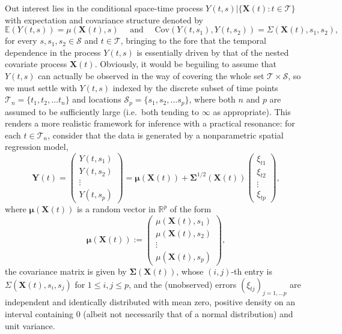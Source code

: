 \documentclass[aos]{imsart}
\theoremstyle{plain}
\theoremstyle{remark}
\def\E{\mathbb{E}}
\newcommand{\Scal}{\mathcal{S}}
\newcommand{\Tcal}{\mathcal{T}}
\newcommand{\bb}[1]{\boldsymbol{#1}}
\newcommand{\cov}{\mathrm{Cov}}
\begin{document}
Out interest lies in the conditional space-time process  $Y(t, s) | \{ \bb{X}(t) : t \in \Tcal\}$ with expectation and covariance structure denoted by
\begin{equation}
      \E(Y(t, s)) = \mu(\bb{X}(t), s) \quad  \mbox{ and }  \quad
      \cov(Y(t, s_1), Y(t, s_2)) = \Sigma(\bb{X}(t), s_1, s_2),
    \label{eqn:general-setup}
\end{equation}
for every $s, s_1, s_2 \in \Scal$ and $t \in \Tcal$, bringing to the fore that the temporal dependence in the process $Y(t, s)$ is essentially driven by that of the nested covariate process $\bb{X}(t)$. Obviously, it would be beguiling to assume that $Y(t, s)$ can actually be observed in the way of covering the whole set $\Tcal \times \Scal$, so we must settle with $Y(t, s)$ indexed by the discrete subset of time points $\Tcal_n = \{t_1, t_2, \dots t_n \}$ and locations $\Scal_p = \{ s_1, s_2, \dots s_p \}$, where both $n$ and $p$ are assumed to be sufficiently large (i.e.\ both tending to $\infty$ as appropriate). This renders a more realistic framework for inference with a practical resonance: for each $t \in \Tcal_n$, consider that the data is generated by a nonparametric spatial regression model,
\begin{equation}\label{eqn:setup}
    \bb{Y}(t) = 
    \begin{pmatrix}
    Y(t,s_1)\\ Y(t, s_2) \\ \vdots \\ Y(t, s_p)
    \end{pmatrix} 
    = \bb{\mu}(\bb{X}(t)) 
    + \bb{\Sigma}^{1/2}(\bb{X}(t)) \begin{pmatrix}
   \xi_{t1}\\ \xi_{t2} \\ \vdots \\ \xi_{tp}
    \end{pmatrix},
\end{equation}
where $\bb{\mu}(\bb{X}(t))$ is a random vector in $\mathbb{R}^p$ of the form
\begin{equation*}
    \bb{\mu}(\bb{X}(t)) := \begin{pmatrix}
      \mu(\bb{X}(t), s_1)\\
      \mu(\bb{X}(t), s_2)\\
      \vdots \\
      \mu(\bb{X}(t), s_p)
    \end{pmatrix},
\end{equation*}
the covariance matrix is given by $\bb{\Sigma}(\bb{X}(t))$, whose $(i, j)$-th entry is $\Sigma(\bb{X}(t), s_i, s_j)$ for $1 \leqslant i, j\leqslant p$, and the (unobserved) errors $\left(\xi_{tj}\right)_{j=1, \dots p}$ are independent and identically distributed with mean zero, positive density on an interval containing $0$ (albeit not necessarily that of a normal distribution) and unit variance.  
\end{document}
